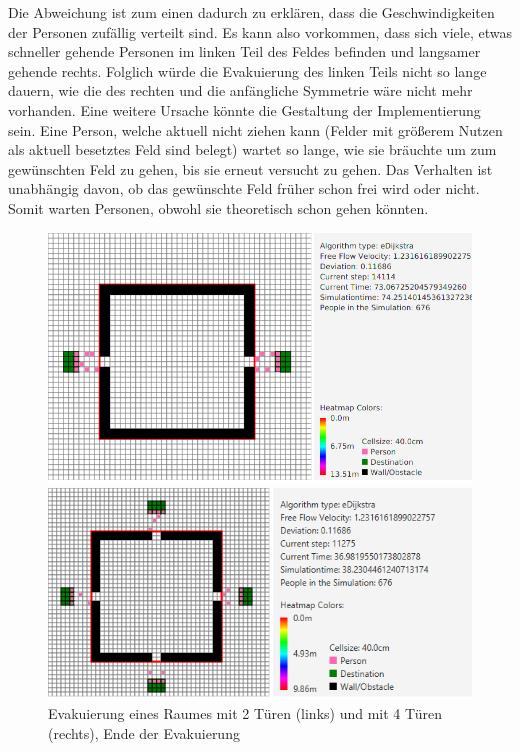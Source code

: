 Die Abweichung ist zum einen dadurch zu erklären, dass die Geschwindigkeiten der Personen zufällig verteilt sind. Es kann also vorkommen, dass sich viele, etwas schneller gehende Personen im linken Teil des Feldes befinden und langsamer gehende rechts. Folglich würde die Evakuierung des linken Teils nicht so lange dauern, wie die des rechten und die anfängliche Symmetrie wäre nicht mehr vorhanden. Eine weitere Ursache könnte die Gestaltung der Implementierung sein. Eine Person, welche aktuell nicht ziehen kann (Felder mit größerem Nutzen als aktuell besetztes Feld sind belegt) wartet so lange, wie sie bräuchte um zum gewünschten Feld zu gehen, bis sie erneut versucht zu gehen. Das Verhalten ist unabhängig davon, ob das gewünschte Feld früher schon frei wird oder nicht. Somit warten Personen, obwohl sie theoretisch schon gehen könnten. 

\begin{figure}[!htb]
	\centering
	\begin{minipage}{.5\textwidth}
		\centering
		\includegraphics[width=\textwidth]{abbildungen/Evak2TuerenEnde.png}
	\end{minipage}%
	\begin{minipage}{0.5\textwidth}
		\centering
		\includegraphics[width=\textwidth]{abbildungen/Evak4TuerenEnde.png}
	\end{minipage}
			\caption{Evakuierung eines Raumes mit 2 Türen (links) und mit 4 Türen (rechts), Ende der Evakuierung}
			\label{fig:Eva2T4TEnde}
\end{figure}

